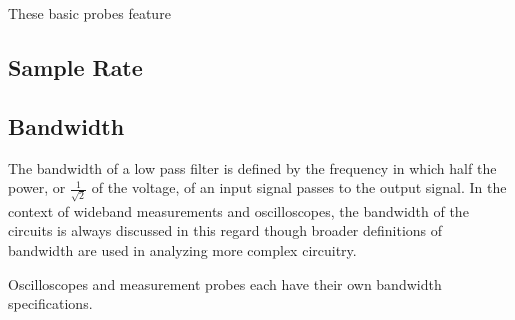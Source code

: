 \documentclass[main.tex]{subfiles}
\begin{document}
These basic probes feature 





\subsection{Sample Rate}

\subsection{Bandwidth}
The bandwidth of a low pass filter is defined by the frequency in which half the power, or $\frac{1}{\sqrt{2}}$ of the voltage, of an input signal passes to the output signal. In the context of wideband measurements and oscilloscopes, the bandwidth of the circuits is always discussed in this regard though broader definitions of bandwidth are used in analyzing more complex circuitry.

Oscilloscopes and measurement probes each have their own bandwidth specifications. 
\end{document}
